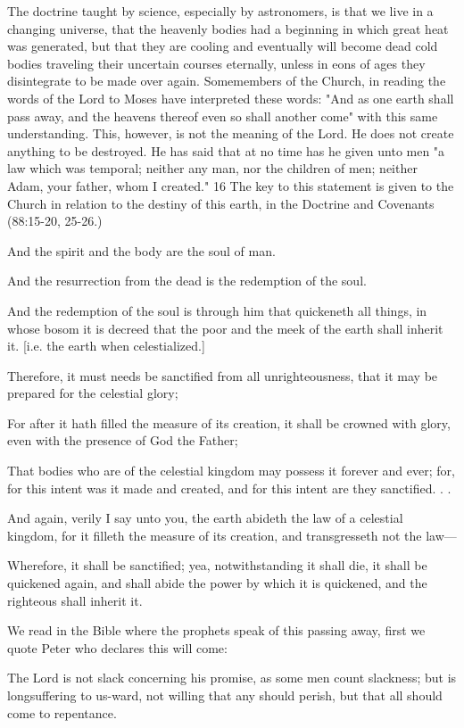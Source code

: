 The doctrine taught by science, especially by astronomers, is that we live in a changing
universe, that the heavenly bodies had a beginning in which great heat was generated, but
that they are cooling and eventually will become dead cold bodies traveling their uncertain
courses eternally, unless in eons of ages they disintegrate to be made over again. Somemembers of the Church, in reading the words of the Lord to Moses have interpreted these
words: "And as one earth shall pass away, and the heavens thereof even so shall another
come" with this same understanding. This, however, is not the meaning of the Lord. He does
not create anything to be destroyed. He has said that at no time has he given unto men "a law
which was temporal; neither any man, nor the children of men; neither Adam, your father,
whom I created." 16 The key to this statement is given to the Church in relation to the destiny
of this earth, in the Doctrine and Covenants (88:15-20, 25-26.)

And the spirit and the body are the soul of man.

And the resurrection from the dead is the redemption of the soul.

And the redemption of the soul is through him that quickeneth all things, in whose bosom it
is decreed that the poor and the meek of the earth shall inherit it. [i.e. the earth when
celestialized.]

Therefore, it must needs be sanctified from all unrighteousness, that it may be prepared for
the celestial glory;

For after it hath filled the measure of its creation, it shall be crowned with glory, even with
the presence of God the Father;

That bodies who are of the celestial kingdom may possess it forever and ever; for, for this
intent was it made and created, and for this intent are they sanctified. . .

And again, verily I say unto you, the earth abideth the law of a celestial kingdom, for it filleth
the measure of its creation, and transgresseth not the law—

Wherefore, it shall be sanctified; yea, notwithstanding it shall die, it shall be quickened again,
and shall abide the power by which it is quickened, and the righteous shall inherit it.

We read in the Bible where the prophets speak of this passing away, first we quote Peter who
declares this will come:

The Lord is not slack concerning his promise, as some men count slackness; but is
longsuffering to us-ward, not willing that any should perish, but that all should come to
repentance.

